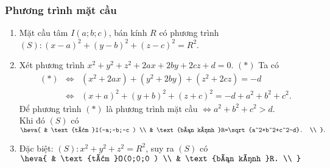 \begin{tomtat}
	\subsubsection{Phương trình mặt cầu}
	\begin{enumerate}
		\item Mặt cầu tâm $I(a;b;c )$, bán kính $R$ có phương trình
		$(S )\colon (x-a )^2+(y-b )^2+(z-c )^2=R^2$.
		\item Xét phương trình $x^2+y^2+z^2+2ax+2by+2cz+d=0$. $(* )$
		Ta có \begin{eqnarray*}
			(* )&\Leftrightarrow& (x^2+2ax )+(y^2+2by )+(z^2+2cz )=-d\\
			&\Leftrightarrow& (x+a )^2+(y+b )^2+(z+c )^2=-d+a^2+b^2+c^2.
		\end{eqnarray*}
		Để phương trình $(* )$ là phương trình mặt cầu $\Leftrightarrow a^2+b^2+c^2>d$.\\ Khi đó $(S )$ có
		$\heva{
			& \text{tâm }I(-a;-b;-c ) \\
			& \text{bán kính }R=\sqrt{a^2+b^2+c^2-d}. \\
		}.$
		\item Đặc biệt: $(S )\colon x^2+y^2+z^2=R^2$, suy ra $(S )$ có $\heva{
			& \text{tâm }O(0;0;0 ) \\
			& \text{bán kính }R. \\
		}$
	\end{enumerate}
	\end{tomtat}

